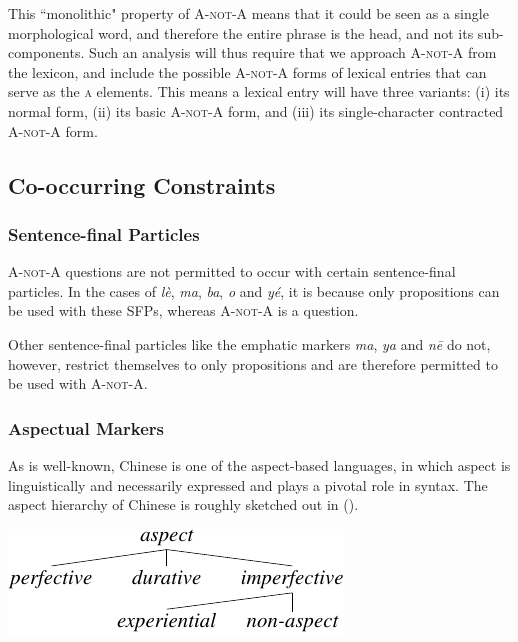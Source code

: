 \documentclass[11pt]{article}
\def\anota{\textsc{A-not-A}}
\newcommand{\myref}[1]{(\getref{#1})}
\begin{document}
This ``monolithic" property of {\anota} means that it could be seen as a
single morphological word, and therefore the entire phrase is the head,
and not its sub-components. Such an analysis will thus require that we
approach {\anota} from the lexicon, and include the possible {\anota}
forms of lexical entries that can serve as the \textsc{a} elements. This
means a lexical entry will have three variants: (i) its normal form,
(ii) its basic {\anota} form, and (iii) its single-character contracted
{\anota} form.


\subsection{Co-occurring Constraints}
\label{ssec:cooccurring}




\subsubsection{Sentence-final Particles}
\label{sssec:sfp}

{\anota} questions are not permitted to occur with certain
sentence-final particles. In the cases of 
\textit{l\`{e}},  \textit{ma}, 
\textit{ba},  \textit{o} and 
\textit{y\'{e}}, it is because only propositions can be used with these
SFPs, whereas {\anota} is a question.


Other sentence-final particles like the emphatic markers
 \textit{ma},  \textit{ya} and
 \textit{n\={e}} do not, however, restrict themselves
to only propositions and are therefore permitted to be used with
{\anota}.


\subsubsection{Aspectual Markers}
\label{sssec:lzg}


As is well-known, Chinese is one of the aspect-based languages, in which
aspect is linguistically and necessarily expressed and plays a pivotal
role in syntax. The aspect hierarchy of Chinese is roughly sketched out
in \myref{fig:aspect}.


{\small 
\ex{}
\vspace{-10pt}
\newline
\includegraphics[scale=.8]{pdf/aspect.pdf}
\xe}
\vspace{-20pt}
\end{document}
